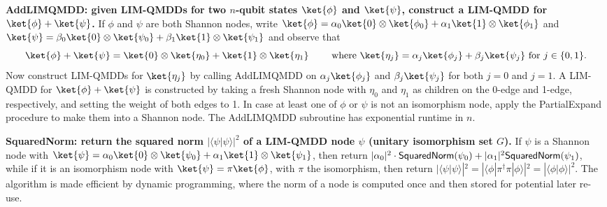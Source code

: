                \textbf{\textsf{AddLIMQMDD}: given LIM-QMDDs for two $n$-qubit states $\ket{\phi}$ and $\ket{\psi}$, construct a LIM-QMDD for $\ket{\phi} + \ket{\psi}$.}
               If $\phi$ and $\psi$ are both Shannon nodes, write
               $\ket{\phi} = \alpha_0 \ket{0}\otimes\ket{\phi_0} + \alpha_1 \ket{1}\otimes\ket{\phi_1}$
               and
               $\ket{\psi} = \beta_0 \ket{0}\otimes\ket{\psi_0} + \beta_1\ket{1}\otimes\ket{\psi_1}$ and observe that 
               \[
               \ket{\phi} + \ket{\psi}=
               \ket{0}\otimes\ket{\eta_0} + \ket{1}\otimes\ket{\eta_1}
               \qquad\textnormal{ where }
               \ket{\eta_j} = \alpha_j\ket{\phi_j} + \beta_j\ket{\psi_j}
               \textnormal{ for $j\in \{0, 1\}$}
               .
           \]
           Now construct LIM-QMDDs for $\ket{\eta_j}$ by calling \textsf{AddLIMQMDD} on $\alpha_j\ket{\phi_j}$ and $\beta_j\ket{\psi_j}$ for both $j=0$ and $j=1$.
A LIM-QMDD for $\ket{\phi} + \ket{\psi}$ is constructed by taking a fresh Shannon node with $\eta_0$ and $\eta_1$ as children on the 0-edge and 1-edge, respectively, and setting the weight of both edges to 1.
        In case at least one of $\phi$ or $\psi$ is not an isomorphism node, apply the \textsf{PartialExpand} procedure to make them into a Shannon node.
        The \textsf{AddLIMQMDD} subroutine has exponential runtime in $n$.
        
        



\textbf{\textsf{SquaredNorm: }return the squared norm $|\langle \psi |\psi \rangle|^2$ of a LIM-QMDD node $\psi$ (unitary isomorphism set $G$).} If $\psi$ is a Shannon node with $\ket{\psi} = \alpha_0 \ket{0}\otimes \ket{\psi_0} + \alpha_1 \ket{1}\otimes\ket{\psi_1}$, then return $|\alpha_0|^2\cdot \textnormal{\textsf{SquaredNorm}}(\psi_0) + |\alpha_1|^2 \textnormal{\textsf{SquaredNorm}}(\psi_1)$, while if it is an isomorphism node with $\ket{\psi} = \pi\ket{\phi}$, with $\pi$ the isomorphism, then return $|\langle \psi|\psi\rangle |^2 = |\langle \phi|\pi^{\dagger} \pi |\phi\rangle|^2 = |\langle \phi | \phi\rangle|^2$. The algorithm is made efficient by dynamic programming, where the norm of a node is computed once and then stored for potential later re-use.
